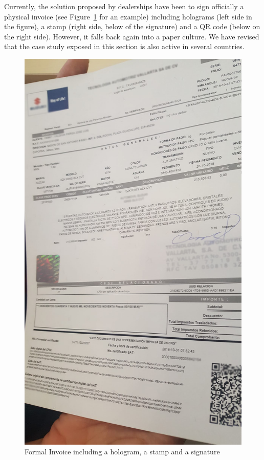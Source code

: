 Currently, the solution proposed by dealerships have been to sign officially a physical 
invoice (see Figure~\ref{fig:invoice} for an example) including holograms (left side
in the figure), a stamp (right side, below of the signature) and a QR code (below on the
right side). 
However, it falls back again into a paper culture. We have revised that the case 
study exposed in this section is also active in several countries.
\begin{figure}[hbt]
  \centering
    \includegraphics[scale=0.4]{images/lopez1.png}
        \caption{Formal Invoice including a hologram, a stamp and a signature}
    \label{fig:invoice}
\end{figure}

